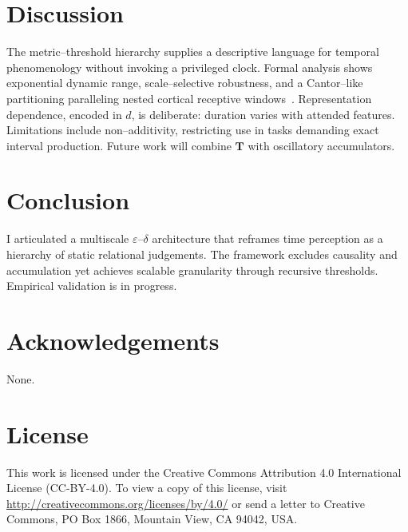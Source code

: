 \documentclass[preprint,11pt]{elsarticle}
\begin{document}
\section{Discussion}
The metric--threshold hierarchy supplies a descriptive language for
temporal phenomenology without invoking a privileged clock.  Formal
analysis shows exponential dynamic range, scale--selective robustness,
and a Cantor--like partitioning paralleling nested cortical receptive
windows~\citep{hasson2008hierarchical}.  Representation dependence,
encoded in $d$, is deliberate: duration varies with attended features.
Limitations include non--additivity, restricting use in tasks demanding
exact interval production.  Future work will combine $\mathbf T$ with
oscillatory accumulators.

\section{Conclusion}
I articulated a multiscale $\varepsilon$--$\delta$ architecture that
reframes time perception as a hierarchy of static relational
judgements.  The framework excludes causality and accumulation yet
achieves scalable granularity through recursive thresholds.
Empirical validation is in progress.

\section*{Acknowledgements}
None.

\section*{License}
This work is licensed under the Creative Commons Attribution 4.0 International License (CC-BY-4.0). To view a copy of this license, visit \url{http://creativecommons.org/licenses/by/4.0/} or send a letter to Creative Commons, PO Box 1866, Mountain View, CA 94042, USA.



\end{document}
